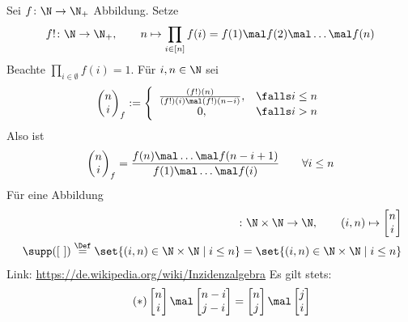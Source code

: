 \begin{bemerkungnr}
	Sei $f\colon\N\to\N_+$ Abbildung. 
	Setze
	\begin{align*}
		f!\colon\N\to\N_+,\qquad n\mapsto \prod\limits_{i\in[n]} f(i)=f(1)\mal f(2)\mal\ldots\mal f(n)
	\end{align*}
	Beachte $\prod\limits_{i\in\emptyset} f(i)=1$.
	Für $i,n\in\N$ sei
	\begin{align*}
		\begin{pmatrix}
			n\\
			i
		\end{pmatrix}_f
		:=\left\lbrace\begin{array}{cl}
			\frac{(f!)(n)}{(f!)(i)\mal(f!)(n-i)},&\falls i\leq n\\
			0, &\falls i>n
		\end{array}\right.
	\end{align*}
	Also ist 
	\begin{align*}
		\begin{pmatrix}
			n\\
			i
		\end{pmatrix}_f
		=\frac{
			f(n)\mal\ldots\mal f(n-i+1)
		}{
			f(1)\mal\ldots\mal f(i)
		}\qquad\forall i\leq n
	\end{align*}
	Für eine Abbildung
	\begin{align*}
		[~]\colon\N\times\N\to\N,\qquad
		(i,n)\mapsto\begin{bmatrix}
			n\\
			i
		\end{bmatrix}\\
		\mit~
		\supp([~])
		\overset{\Def}{=}
		\set{(i,n)\in\N\times\N\mid i\leq n}
		=\set{(i,n)\in\N\times\N\mid i\leq n}
	\end{align*}
	 Link: \url{https://de.wikipedia.org/wiki/Inzidenzalgebra}
	 Es gilt stets:
	 \begin{align}\label{eq:24.4Stern}\tag{$*$}
	 	\begin{bmatrix}
	 		n\\
	 		i
	 	\end{bmatrix}\mal\begin{bmatrix}
	 		n-i\\
	 		j-i
	 	\end{bmatrix}
	 	=\begin{bmatrix}
	 		n\\
	 		j
	 	\end{bmatrix}\mal\begin{bmatrix}
	 		j\\
	 		i
	 	\end{bmatrix}

\end{align}
\end{bemerkungnr}
